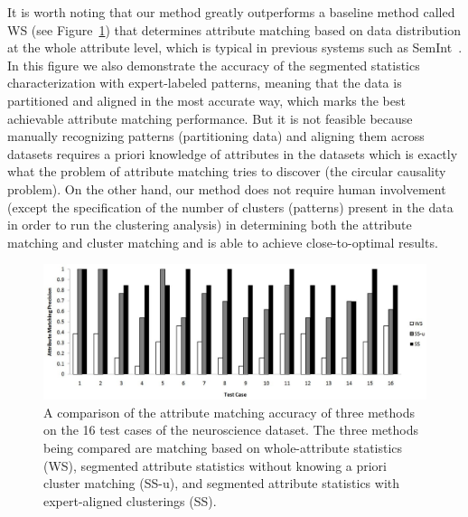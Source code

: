 It is worth noting that our method greatly outperforms a baseline method called WS (see Figure~\ref{fig:perf_comp}) that determines attribute matching based on data distribution at the whole attribute level, which is typical in previous systems such as SemInt~\cite{Li00semint:a}. In this figure we also demonstrate the accuracy of the segmented statistics characterization with expert-labeled patterns, meaning that the data is partitioned and aligned in the most accurate way, which marks the best achievable attribute matching performance. But it is not feasible because manually recognizing patterns (partitioning data) and aligning them across datasets requires a priori knowledge of attributes in the datasets which is exactly what the problem of attribute matching tries to discover (the circular causality problem). On the other hand, our method does not require human involvement (except the specification of the number of clusters (patterns) present in the data in order to run the clustering analysis) in determining both the attribute matching and cluster matching and is able to achieve close-to-optimal results.

\begin{figure}[tb]
\begin{center}
\includegraphics[width=1.\textwidth]{fig/perf_comp.eps}
\end{center}
\caption[A comparison between methods on the neuroscience dataset]{\label{fig:perf_comp} A comparison of the attribute matching accuracy of three methods on the 16 test cases of the neuroscience dataset. The three methods being compared are matching based on whole-attribute statistics (WS), segmented attribute statistics without knowing a priori cluster matching (SS-u), and segmented attribute statistics with expert-aligned clusterings (SS).}
\end{figure}


